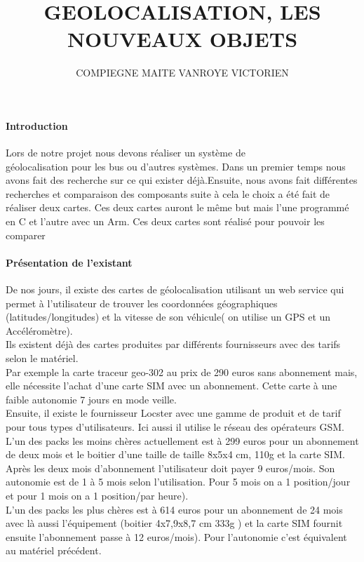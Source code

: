\documentclass[10pt,a4paper]{article}
\author{COMPIEGNE MAITE VANROYE VICTORIEN}
\title{GEOLOCALISATION, LES NOUVEAUX OBJETS}
\begin{document}
\paragraph{Introduction}
Lors de notre projet nous devons réaliser un système de\\ géolocalisation pour les bus ou d'autres systèmes. Dans un premier temps nous avons fait des recherche sur ce qui exister déjà.Ensuite, nous avons fait différentes recherches et comparaison des composants suite à cela le choix a été fait de réaliser deux cartes. Ces deux cartes auront le même but mais l'une programmé en C et l'autre avec un Arm. Ces deux cartes sont réalisé pour pouvoir les comparer   

\paragraph{Présentation de l'existant}
De nos jours, il existe des cartes de géolocalisation utilisant un web service qui permet à l'utilisateur de trouver les coordonnées géographiques (latitudes/longitudes) et la vitesse de son véhicule( on utilise un GPS et un Accéléromètre).\\Ils existent déjà des cartes produites par différents fournisseurs avec des tarifs selon le matériel.\\Par exemple la carte traceur geo-302 au prix de 290 euros sans abonnement mais, elle nécessite l'achat d'une carte SIM avec un abonnement. Cette carte à une faible autonomie 7 jours en mode veille.\\Ensuite, il existe le fournisseur Locster avec une gamme de produit et de tarif pour tous types d'utilisateurs. Ici aussi il utilise le réseau des opérateurs GSM.\\L'un des packs les moins chères actuellement est à 299 euros pour un abonnement de deux mois et le boitier d'une taille de taille 8x5x4 cm, 110g et la carte SIM. Après les deux mois d'abonnement l'utilisateur doit payer 9 euros/mois. Son autonomie est de 1 à 5 mois selon l'utilisation. Pour 5 mois on a 1 position/jour et pour 1 mois on a 1 position/par heure).\\L'un des packs les plus chères est à 614 euros pour un abonnement de 24 mois avec là aussi l'équipement (boitier 4x7,9x8,7 cm 333g ) et la carte SIM fournit ensuite l'abonnement passe à 12 euros/mois). Pour l'autonomie c'est équivalent au matériel précédent. 
\end{document}
